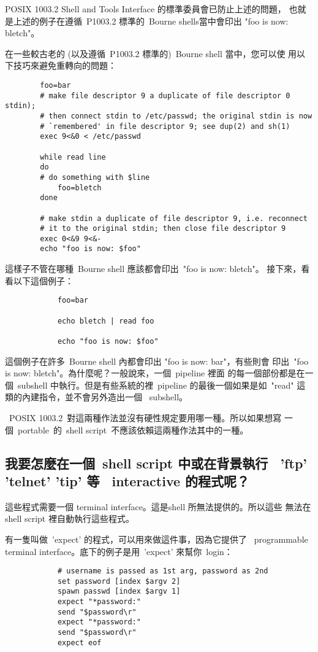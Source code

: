 \documentclass{article}
\begin{document}
\begin{CJK*}{Bg5}{ming}
	POSIX 1003.2 Shell and Tools Interface 的標準委員會已防止上述的問題，
        也就是上述的例子在遵循~P1003.2 標準的~Bourne shells當中會印出 
        "foo is now: bletch"。

	在一些較古老的 (以及遵循~P1003.2 標準的)~Bourne shell 當中，您可以使
        用以下技巧來避免重轉向的問題：
\begin{verbatim}
		foo=bar
		# make file descriptor 9 a duplicate of file descriptor 0 stdin);
		# then connect stdin to /etc/passwd; the original stdin is now
		# `remembered' in file descriptor 9; see dup(2) and sh(1)
		exec 9<&0 < /etc/passwd

		while read line
		do
		# do something with $line
		    foo=bletch
		done

		# make stdin a duplicate of file descriptor 9, i.e. reconnect
		# it to the original stdin; then close file descriptor 9
		exec 0<&9 9<&-
		echo "foo is now: $foo"
\end{verbatim}
	這樣子不管在哪種~Bourne shell 應該都會印出~"foo is now: bletch"。
	接下來，看看以下這個例子：
\begin{verbatim}
	        foo=bar

	        echo bletch | read foo

	        echo "foo is now: $foo"
\end{verbatim}
	這個例子在許多~Bourne shell 內都會印出 "foo is now: bar"，有些則會
        印出~"foo is now: bletch"。為什麼呢？一般說來，一個~pipeline 裡面
        的每一個部份都是在一個~subshell 中執行。但是有些系統的裡~pipeline 
        的最後一個如果是如~"read" 這類的內建指令，並不會另外造出一個 
        ~subshell。

	~POSIX 1003.2~對這兩種作法並沒有硬性規定要用哪一種。所以如果想寫
	一個~portable~的~shell script~不應該依賴這兩種作法其中的一種。

\subsection{我要怎麼在一個~shell script 中或在背景執行
	~'ftp' 'telnet' 'tip' 等 ~interactive 的程式呢？}

	這些程式需要一個 terminal interface。這是shell 所無法提供的。所以這些
	無法在 shell script 裡自動執行這些程式。

	有一隻叫做~'expect' 的程式，可以用來做這件事，因為它提供了 
        ~programmable terminal interface。底下的例子是用~'expect' 來幫你~login：
\begin{verbatim}
	        # username is passed as 1st arg, password as 2nd
	        set password [index $argv 2]
	        spawn passwd [index $argv 1]
	        expect "*password:"
	        send "$password\r"
	        expect "*password:"
	        send "$password\r"
	        expect eof
\end{verbatim}


\end{CJK*}
\end{document}
